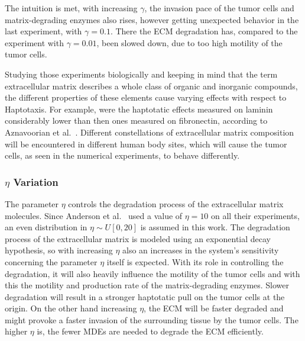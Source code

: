 The intuition is met, with increasing $\gamma$, the invasion pace of the tumor cells and matrix-degrading enzymes also rises, however getting unexpected behavior in the last experiment, with $\gamma=0.1$. There the ECM degradation has, compared to the experiment with $\gamma=0.01$, been slowed down, due to too high motility of the tumor cells.

Studying those experiments biologically and keeping in mind that the term extracellular matrix describes a whole class of organic and inorganic compounds, the different properties of these elements cause varying effects with respect to Haptotaxis. For example, were the haptotatic effects measured on laminin considerably lower than then ones measured on fibronectin, according to Aznavoorian et al.~\cite{article}. Different constellations of extracellular matrix composition will be encountered in different human body sites, which will cause the tumor cells, as seen in the numerical experiments, to behave differently.

\subsubsection*{$\eta$ Variation}
The parameter $\eta$ controls the degradation process of the extracellular matrix molecules. Since Anderson et al.~\cite{anderson_mathematical_2000} used a value of $\eta=10$ on all their experiments, an even distribution in $\eta \sim U[0, 20]$ is assumed in this work. The degradation process of the extracellular matrix is modeled using an exponential decay hypothesis, so with increasing $\eta$ also an increases in the system's sensitivity concerning the parameter $\eta$ itself is expected. With its role in controlling the degradation, it will also heavily influence the motility of the tumor cells and with this the motility and production rate of the matrix-degrading enzymes. Slower degradation will result in a stronger haptotatic pull on the tumor cells at the origin. On the other hand increasing $\eta$, the ECM will be faster degraded and might provoke a faster invasion of the surrounding tissue by the tumor cells. The higher $\eta$ is, the fewer MDEs are needed to degrade the ECM efficiently.

